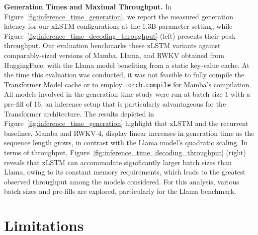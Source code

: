 \textbf{Generation Times and Maximal Throughput.} In Figure~\ref{fig:inference_time_generation}, we report the measured generation latency for our xLSTM configurations at the 1.3B parameter setting, while Figure~\ref{fig:inference_time_decoding_throughput} (left) presents their peak throughput. Our evaluation benchmarks these xLSTM variants against comparably-sized versions of Mamba, Llama, and RWKV obtained from HuggingFace, with the Llama model benefiting from a static key-value cache. At the time this evaluation was conducted, it was not feasible to fully compile the Transformer Model cache or to employ \texttt{torch.compile} for Mamba’s compilation. All models involved in the generation time study were run at batch size 1 with a pre-fill of 16, an inference setup that is particularly advantageous for the Transformer architecture. 
The results depicted in Figure~\ref{fig:inference_time_generation} highlight that xLSTM and the recurrent baselines, Mamba and RWKV-4, display linear increases in generation time as the sequence length grows, in contrast with the Llama model’s quadratic scaling. In terms of throughput, Figure~\ref{fig:inference_time_decoding_throughput} (right) reveals that xLSTM can accommodate significantly larger batch sizes than Llama, owing to its constant memory requirements, which leads to the greatest observed throughput among the models considered. For this analysis, various batch sizes and pre-fills are explored, particularly for the Llama benchmark.

\section{Limitations}

